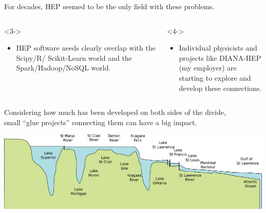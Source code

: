 \documentclass[aspectratio=169]{beamer}
\begin{document}
\begin{frame}{}
\begin{center}
\Large For decades, HEP seemed to be the only field with these problems.

\vspace{0.5 cm}
\end{center}

\begin{columns}
\begin{uncoverenv}<3->
\begin{itemize}
\item HEP software needs clearly overlap with the Scipy/R/ Scikit-Learn world and the Spark/Hadoop/NoSQL world. \\ \mbox{ }
\end{itemize}
\end{uncoverenv}

\begin{uncoverenv}<4->
\begin{itemize}
\item Individual physicists and projects like DIANA-HEP \\ (my employer) are starting to explore and develop these connections.
\end{itemize}
\end{uncoverenv}

\end{columns}
\vspace{-1.5 cm}
\end{frame}

\begin{frame}{}
\vspace{1 cm}
\begin{center}
\large Considering how much has been developed on both sides of the divide, \\ small ``glue projects'' connecting them can have a big impact.
\end{center}

\vspace{1 cm}
\mbox{\hspace{-1.2 cm}}\includegraphics[width=1.16\linewidth]{great_lakes_levels.pdf}
\vspace{-1 cm}
\end{frame}
\end{document}
